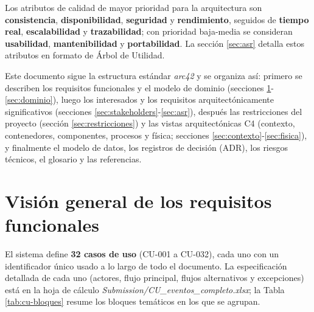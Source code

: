 \documentclass[11pt,a4paper]{article}
\begin{document}
Los atributos de calidad de mayor prioridad para la arquitectura son \textbf{consistencia},
\textbf{disponibilidad}, \textbf{seguridad} y \textbf{rendimiento}, seguidos de \textbf{tiempo
real}, \textbf{escalabilidad} y \textbf{trazabilidad}; con prioridad baja-media se consideran
\textbf{usabilidad}, \textbf{mantenibilidad} y \textbf{portabilidad}. La sección
\ref{sec:asr} detalla estos atributos en formato de Árbol de Utilidad.

Este documento sigue la estructura estándar \textit{arc42} y se organiza así: primero se describen
los requisitos funcionales y el modelo de dominio (secciones \ref{sec:reqs}-\ref{sec:dominio}),
luego los interesados y los requisitos arquitectónicamente significativos (secciones
\ref{sec:stakeholders}-\ref{sec:asr}), después las restricciones del proyecto (sección
\ref{sec:restricciones}) y las vistas arquitectónicas C4 (contexto, contenedores, componentes,
procesos y física; secciones \ref{sec:contexto}-\ref{sec:fisica}), y finalmente el modelo de
datos, los registros de decisión (ADR), los riesgos técnicos, el glosario y las referencias.

\section{Visión general de los requisitos funcionales}
\label{sec:reqs}

El sistema define \textbf{32 casos de uso} (CU-001 a CU-032), cada uno con un identificador único
usado a lo largo de todo el documento. La especificación detallada de cada uno (actores, flujo
principal, flujos alternativos y excepciones) está en la hoja de cálculo
\textit{Submission/CU\_eventos\_completo.xlsx}; la Tabla \ref{tab:cu-bloques} resume los bloques
temáticos en los que se agrupan.
\end{document}
